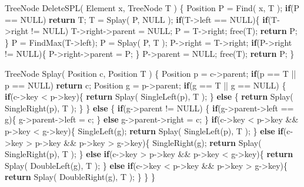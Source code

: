 \documentclass[]{article}
\newenvironment{Shaded}{}{}
\newcommand{\ControlFlowTok}[1]{\textcolor[rgb]{0.00,0.44,0.13}{\textbf{#1}}}
\newcommand{\NormalTok}[1]{#1}
\begin{document}
\begin{Shaded}
\begin{Highlighting}[]
\NormalTok{TreeNode DeleteSPL( Element x, TreeNode T )}
\NormalTok{\{}
\NormalTok{    Position P = Find( x, T );}
    \ControlFlowTok{if}\NormalTok{(P == NULL) }
        \ControlFlowTok{return}\NormalTok{ T;}
\NormalTok{    T = Splay( P, NULL ); }
    \ControlFlowTok{if}\NormalTok{(T->left == NULL)\{}
        \ControlFlowTok{if}\NormalTok{(T->right != NULL)}
\NormalTok{            T->right->parent = NULL;}
\NormalTok{        P = T->right; }
\NormalTok{        free(T);}
        \ControlFlowTok{return}\NormalTok{ P;}
\NormalTok{    \}}
\NormalTok{    P = FindMax(T->left); }
\NormalTok{    P = Splay( P, T ); }
\NormalTok{    P->right = T->right;  }
    \ControlFlowTok{if}\NormalTok{(P->right != NULL)\{}
\NormalTok{        P->right->parent = P;}
\NormalTok{    \}}
\NormalTok{    P->parent = NULL;}
\NormalTok{    free(T);}
    \ControlFlowTok{return}\NormalTok{ P;}
\NormalTok{\}}


\NormalTok{TreeNode Splay( Position c, Position T )}
\NormalTok{\{}
\NormalTok{    Position p = c->parent;   }
    \ControlFlowTok{if}\NormalTok{(p == T || p == NULL) }
        \ControlFlowTok{return}\NormalTok{ c;}
\NormalTok{    Position g = p->parent;  }
    \ControlFlowTok{if}\NormalTok{(g == T || g == NULL)   }
\NormalTok{    \{}
        \ControlFlowTok{if}\NormalTok{(c->key < p->key)\{}
            \ControlFlowTok{return}\NormalTok{ Splay( SingleLeft(p), T );}
\NormalTok{        \}}
        \ControlFlowTok{else}
\NormalTok{        \{}
            \ControlFlowTok{return}\NormalTok{ Splay( SingleRight(p), T );}
\NormalTok{        \}}
\NormalTok{    \}}
    \ControlFlowTok{else}
\NormalTok{    \{}
        \ControlFlowTok{if}\NormalTok{(g->parent != NULL) }
\NormalTok{        \{}
            \ControlFlowTok{if}\NormalTok{(g->parent->left == g)\{}
\NormalTok{                g->parent->left = c;}
\NormalTok{            \}}
            \ControlFlowTok{else}\NormalTok{ g->parent->right = c;}
\NormalTok{        \}}
        \ControlFlowTok{if}\NormalTok{(c->key < p->key && p->key < g->key)\{}
\NormalTok{            SingleLeft(g);}
            \ControlFlowTok{return}\NormalTok{ Splay( SingleLeft(p), T );}
\NormalTok{        \}}
        \ControlFlowTok{else} \ControlFlowTok{if}\NormalTok{(c->key > p->key && p->key > g->key)\{}
\NormalTok{            SingleRight(g);}
            \ControlFlowTok{return}\NormalTok{ Splay( SingleRight(p), T );}
\NormalTok{        \}}
        \ControlFlowTok{else} \ControlFlowTok{if}\NormalTok{(c->key > p->key && p->key < g->key)\{}
            \ControlFlowTok{return}\NormalTok{ Splay( DoubleLeft(g), T );}
\NormalTok{        \}}
        \ControlFlowTok{else} \ControlFlowTok{if}\NormalTok{(c->key < p->key && p->key > g->key)\{}
            \ControlFlowTok{return}\NormalTok{ Splay( DoubleRight(g), T );}
\NormalTok{        \}}
\NormalTok{    \}}
\NormalTok{\}}
\end{Highlighting}
\end{Shaded}
\end{document}
